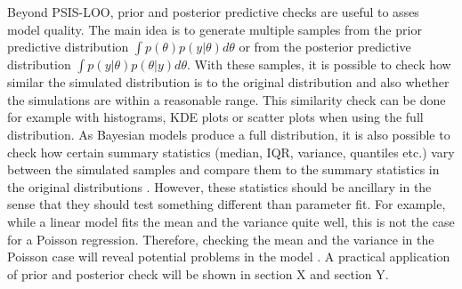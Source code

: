 Beyond PSIS-LOO, prior and posterior predictive checks are useful to asses model quality.
The main idea is to generate multiple samples from the prior predictive distribution $\int p(\theta) p(y|\theta)d\theta$ or from the posterior predictive distribution $\int p(y | \theta) p(\theta|y) d\theta$.
With these samples, it is possible to check how similar the simulated distribution is to the original distribution and also whether the simulations are within a reasonable range.
This similarity check can be done for example with histograms, KDE plots or scatter plots when using the full distribution.
As Bayesian models produce a full distribution, it is also possible to check how certain summary statistics (median, IQR, variance, quantiles etc.) vary between the simulated samples and compare them to the summary statistics in the original distributions \citep[Chapter 6]{gelman_bayesian_2014}.
However, these statistics should be ancillary in the sense that they should test something different than parameter fit.
For example, while a linear model fits the mean and the variance quite well, this is not the case for a Poisson regression.
Therefore, checking the mean and the variance in the Poisson case will reveal potential problems in the model \citep[Chapter 27.3]{stan_development_team_stan_2021}.
A practical application of prior and posterior check will be shown in section X and section Y.




